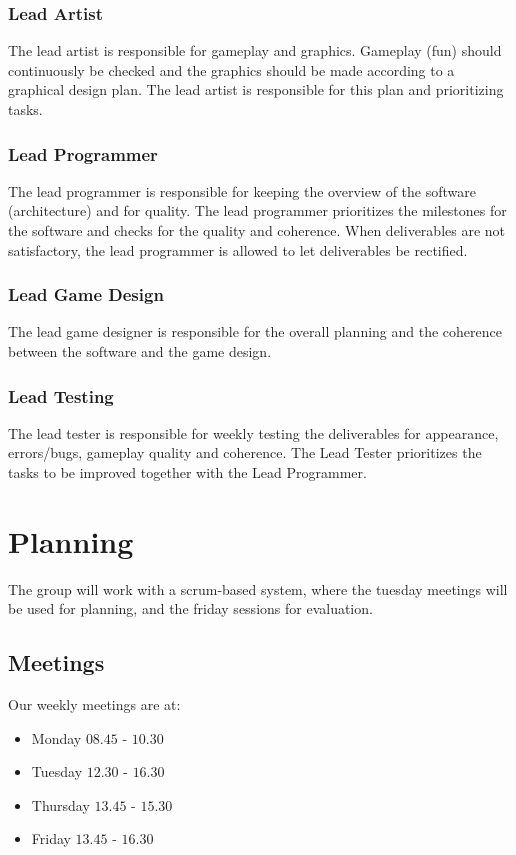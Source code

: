 \documentclass[a4paper,11pt,notitlepage]{report}
\begin{document}
\subsection{Lead Artist}
The lead artist is responsible for gameplay and graphics. Gameplay (fun) should continuously be checked and the graphics should be made according to a graphical design plan. The lead artist is responsible for this plan and prioritizing tasks.

\subsection{Lead Programmer}
The lead programmer is responsible for keeping the overview of the software (architecture) and for quality. The lead programmer prioritizes the milestones for the software and checks for the quality and coherence. When deliverables are not satisfactory, the lead programmer is allowed to let deliverables be rectified.

\subsection{Lead Game Design}
The lead game designer is responsible for the overall planning and the coherence between the software and the game design. 

\subsection{Lead Testing}
The lead tester is responsible for weekly testing the deliverables for appearance, errors/bugs, gameplay quality and coherence. The Lead Tester prioritizes the tasks to be improved together with the Lead Programmer. 

\chapter{Planning}
The group will work with a scrum-based system, where the tuesday meetings will be used for planning, and the friday sessions for evaluation.

\section{Meetings}
Our weekly meetings are at:
\begin{itemize}
	\item Monday $08.45$ - $10.30$
	\item Tuesday $12.30$ - $16.30$
	\item Thursday $13.45$ - $15.30$
	\item Friday $13.45$ - $16.30$
\end{itemize}
\end{document}
